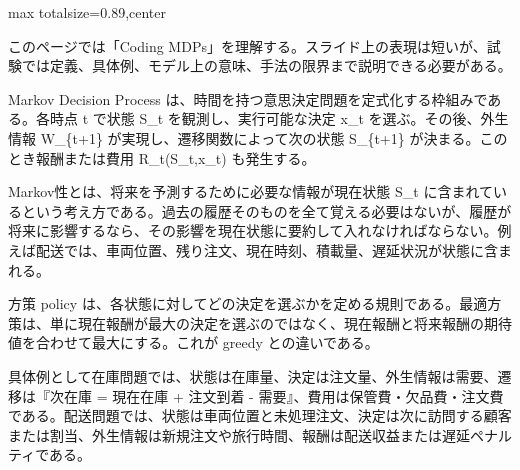\begin{minipage}[t]{0.58\textwidth}
\begin{adjustbox}{max totalsize={\textwidth}{0.89\textheight},center}
\begin{minipage}{\textwidth}\scriptsize
{}このページでは「Coding MDPs」を理解する。スライド上の表現は短いが、試験では定義、具体例、モデル上の意味、手法の限界まで説明できる必要がある。\par
Markov Decision Process は、時間を持つ意思決定問題を定式化する枠組みである。各時点 t で状態 S\_t を観測し、実行可能な決定 x\_t を選ぶ。その後、外生情報 W\_\{t+1\} が実現し、遷移関数によって次の状態 S\_\{t+1\} が決まる。このとき報酬または費用 R\_t(S\_t,x\_t) も発生する。\par
Markov性とは、将来を予測するために必要な情報が現在状態 S\_t に含まれているという考え方である。過去の履歴そのものを全て覚える必要はないが、履歴が将来に影響するなら、その影響を現在状態に要約して入れなければならない。例えば配送では、車両位置、残り注文、現在時刻、積載量、遅延状況が状態に含まれる。\par
方策 policy は、各状態に対してどの決定を選ぶかを定める規則である。最適方策は、単に現在報酬が最大の決定を選ぶのではなく、現在報酬と将来報酬の期待値を合わせて最大にする。これが greedy との違いである。\par
具体例として在庫問題では、状態は在庫量、決定は注文量、外生情報は需要、遷移は『次在庫 = 現在在庫 + 注文到着 - 需要』、費用は保管費・欠品費・注文費である。配送問題では、状態は車両位置と未処理注文、決定は次に訪問する顧客または割当、外生情報は新規注文や旅行時間、報酬は配送収益または遅延ペナルティである。\par

\end{minipage}
\end{adjustbox}
\end{minipage}
